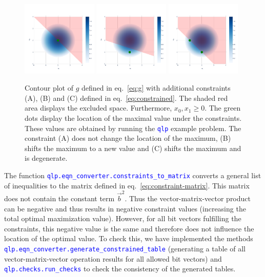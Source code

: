 \documentclass[]{article}
\newcommand{\codeword}[1]{\texttt{\textcolor{blue}{\lstinline{#1}}}
}
\begin{document}
\begin{figure}
	\centering
	\includegraphics[width=0.32\textwidth]{contour-constraint-1}
	\includegraphics[width=0.32\textwidth]{contour-constraint-2}
	\includegraphics[width=0.32\textwidth]{contour-constraint-3}
	\caption{
		\label{fig:constraints}
		Contour plot of $g$ defined in eq.~\eqref{eq:g} with additional constraints (A), (B) and (C) defined in eq.~\eqref{eq:constrained}.
		The shaded red area displays the excluded space.
		Furthermore, $x_0, x_1 \geq 0$.
		The green dots display the location of the maximal value under the constraints.
		These values are obtained by running the \codeword{qlp} example problem.
		The constraint (A) does not change the location of the maximum, (B) shifts the maximum to a new value and (C) shifts the maximum and is degenerate.
	}
\end{figure}
The function \codeword{qlp.eqn_converter.constraints_to_matrix} converts a general list of inequalities to the matrix defined in eq.~\eqref{eq:constraint-matrix}.
This matrix does not contain the constant term $\vec b^2$.
Thus the vector-matrix-vector product can be negative and thus results in negative constraint values (increasing the total optimal maximization value).
However, for all bit vectors fulfilling the constraints, this negative value is the same and therefore does not influence the location of the optimal value.
To check this, we have implemented the methods \codeword{qlp.eqn_converter.generate_constrained_table}  (generating a table of all vector-matrix-vector operation results for all allowed bit vectors) and \codeword{qlp.checks.run_checks} to check the consistency of the generated tables. 
 
\end{document}
